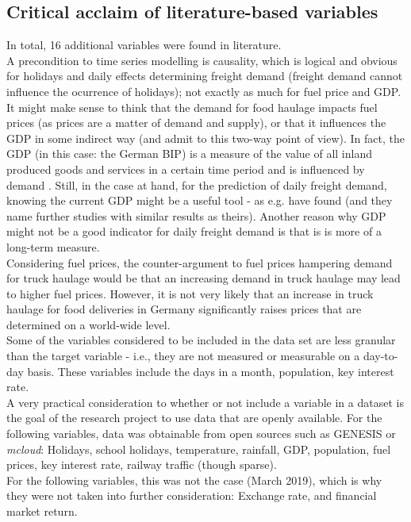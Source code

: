 \documentclass[a4paper, 11pt]{article}
\begin{document}
\subsection{Critical acclaim of literature-based variables}

In total, 16 additional variables were found in literature.\\ 

A precondition to time series modelling is causality, which is logical and obvious for holidays and daily effects determining freight demand (freight demand cannot influence the ocurrence of holidays); not exactly as much for fuel price and GDP.\\
It might make sense to think that the demand for food haulage impacts fuel prices (as prices are a matter of demand and supply), or that it influences the GDP in some indirect way (and \cite{JONG.2004} admit to this two-way point of view). 
In fact, the GDP (in this case: the German BIP) is a measure of the value of all inland produced goods and services in a certain time period \cite{StatistischesBundesamt.} and is influenced by demand \cite{Bundesregierung.}. Still, in the case at hand, for the prediction of daily freight demand, knowing the current GDP might be a useful tool - as e.g. \cite{Intihar.2017} have found (and they name further studies with similar results as theirs). Another reason why GDP might not be a good indicator for daily freight demand is that is is more of a long-term measure. \\
Considering fuel prices, the counter-argument to fuel prices hampering demand for truck haulage would be that an increasing demand in truck haulage may lead to higher fuel prices. However, it is not very likely that an increase in truck haulage for food deliveries in Germany significantly raises prices that are determined on a world-wide level. \\

Some of the variables considered to be included in the data set are less granular than the target variable - i.e., they are not measured or measurable on a day-to-day basis. These variables include the days in a month, population, key interest rate.\\

A very practical consideration to whether or not include a variable in a dataset is the goal of the research project to use data that are openly available.
For the following variables, data was obtainable from open sources such as GENESIS \citep{StatistischesBundesamt.2019} or \textit{mcloud}: Holidays, school holidays, temperature, rainfall, GDP, population, fuel prices, key interest rate, railway traffic (though sparse).\\
For the following variables, this was not the case (March 2019), which is why they were not taken into further consideration: Exchange rate, and financial market return. 
\end{document}
